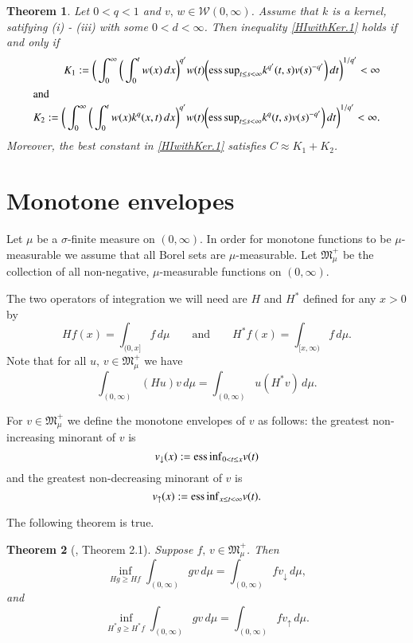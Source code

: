 \documentclass[12pt]{amsart}
\theoremstyle{plain}
\newtheorem{thm}{Theorem}[section]
\theoremstyle{definition}
\numberwithin{thm}{section}
\numberwithin{equation}{section}
\begin{document}
\begin{thm}\cite[Theorem 8]{Krep}\label{Krep}
	Let $0 < q < 1$ and $v,\, w \in {\mathcal W}{(0,\infty)}$. Assume that $k$ is a kernel, satifying (i) - (iii) with some $0 < d < \infty$. Then  inequality \eqref{HIwithKer.1}	holds if and only if
	\begin{align*}
	K_1 : = \bigg( \int_0^{\infty} \bigg( \int_0^t w(x)\,dx\bigg)^{q'} w(t) \bigg( {\operatornamewithlimits{ess\,sup}}_{t \le s < \infty} k^{q'}(t,s)v(s)^{-q'}\bigg) \,dt \bigg)^{1 / q'} < \infty \\
	\intertext{and}
	K_2 : = \bigg( \int_0^{\infty} \bigg( \int_0^t w(x) k^q (x,t )\,dx\bigg)^{q'} w(t) \bigg( {\operatornamewithlimits{ess\,sup}}_{t \le s < \infty} k^{q}(t,s)v(s)^{-q'}\bigg) \,dt \bigg)^{1 / q'} < \infty.
	\end{align*} 
	Moreover, the best constant in \eqref{HIwithKer.1} satisfies $C \approx K_1 + K_2$.
\end{thm}	

\section{Monotone envelopes}\label{mon}

Let $\mu$ be a ${\sigma}$-finite measure on $(0,\infty)$. In order for
monotone functions to be $\mu$-measurable we assume that all Borel
sets are $\mu$-measurable. Let ${{\mathfrak M}}_{\mu}^+$ be the collection of
all non-negative, $\mu$-measurable functions on $(0,\infty)$.

The two operators of integration we will need are $H$ and $H^*$
defined for any $x > 0$ by
$$
H f(x) = \int_{(0,x]} f \,d\mu \qquad \mbox{and} \qquad H^* f(x) =
\int_{[x,\infty)} f \,d \mu.
$$
Note that for all $u,\,v \in {{\mathfrak M}}_{\mu}^+$ we have
$$
\int_{(0,\infty)} (H u)v\,d\mu = \int_{(0,\infty)} u (H^* v)\,d\mu.
$$

For $v \in {{\mathfrak M}}_{\mu}^+$ we define the monotone envelopes of $v$ as
follows: the greatest non-increasing minorant of $v$ is
$$
v_{\downarrow}(x) : = {\operatornamewithlimits{ess\,inf}}_{0 < t \le x}v(t)
$$
and the greatest non-decreasing minorant of $v$ is
$$
v_{\uparrow}(x) : = {\operatornamewithlimits{ess\,inf}}_{x \le t < \infty}v(t).
$$

The following theorem is true.
\begin{thm}[\cite{Sinn}, Theorem 2.1]\label{Sinnamon.thm.1}
	Suppose $f,\, v \in{{\mathfrak M}}_{\mu}^+$. Then
	\begin{equation}\label{Sinnamon.thm.1.eq.1}
	\inf_{Hg \ge Hf} \int_{(0,\infty)} gv\,d\mu = \int_{(0,\infty)} f v_{\downarrow}\,d\mu,
	\end{equation}
	and
	\begin{equation}\label{Sinnamon.thm.1.eq.2}
	\inf_{H^* g \ge H^* f} \int_{(0,\infty)} gv\,d\mu = \int_{(0,\infty)} f
	v_{\uparrow}\,d\mu.
	\end{equation}
\end{thm}
\end{document}

